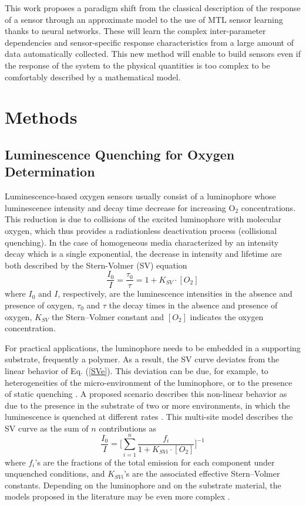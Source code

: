 \documentclass[final,5p,times,twocolumn]{elsarticle}
\begin{document}
This work proposes a paradigm shift from the classical description of the response of a sensor through an approximate model to the use of MTL sensor learning thanks to neural networks. 
These will learn the complex inter-parameter dependencies and sensor-specific response characteristics from a large amount of data automatically collected. This new method will enable to build sensors even if the response of the system to the physical quantities is too complex to be comfortably described by a mathematical model.


\section{Methods}
\label{sec:methods}

\subsection{Luminescence Quenching for Oxygen Determination}
\label{Theory}

Luminescence-based oxygen sensors usually consist of a luminophore whose luminescence intensity and decay time decrease for increasing O$_2$ concentrations. This reduction is due to collisions of the excited luminophore with molecular oxygen, which thus provides a radiationless deactivation process (collisional quenching). 
In the case of homogeneous media characterized by an intensity decay which is a single exponential, the decrease in intensity and lifetime are both described by the Stern-Volmer (SV) equation \cite{Lakowicz2006}
\begin{equation}
\frac{I_0}{I}=\frac{\tau_0}{\tau}=1+K_{SV} \cdot \left[O_2\right]
\label{SVe}
\end{equation}
where $I_0$ and $I$, respectively, are the luminescence intensities in the absence and presence of oxygen, $\tau_0$ and $\tau$ the decay times in the absence and presence of oxygen, $K_{SV}$ the Stern–Volmer constant and $\left[O_2\right]$ indicates the oxygen concentration.

For practical applications, the luminophore needs to be embedded in a supporting substrate, frequently a polymer. As a result, the SV curve deviates from the linear behavior of Eq. (\ref{SVe}). This deviation can be due, for example, to heterogeneities of the micro-environment of the luminophore, or to the presence of static quenching \cite{Wang2014}. A proposed scenario describes this non-linear behavior as due to the presence in the substrate of two or more environments, in which the luminescence is quenched at different rates \cite{Carraway1991,Demas1995}. This multi-site model describes the SV curve as the sum of $n$ contributions as
\begin{equation}
\frac{I_0}{I}=\bigg[ \sum_{i=1}^n
\frac{f_i}{1+K_{SVi} \cdot \left[O_2\right]}
\bigg]^{-1}
\label{SVe2}
\end{equation}
where $f_i$'s are the fractions of the total emission for each component under unquenched conditions, and $K_{SVi}$'s are the associated effective Stern–Volmer constants. Depending on the luminophore and on the substrate material, the models proposed in the literature may be even more complex \cite{Demas1995,Hartmann1995,Mills1999}.
\end{document}
